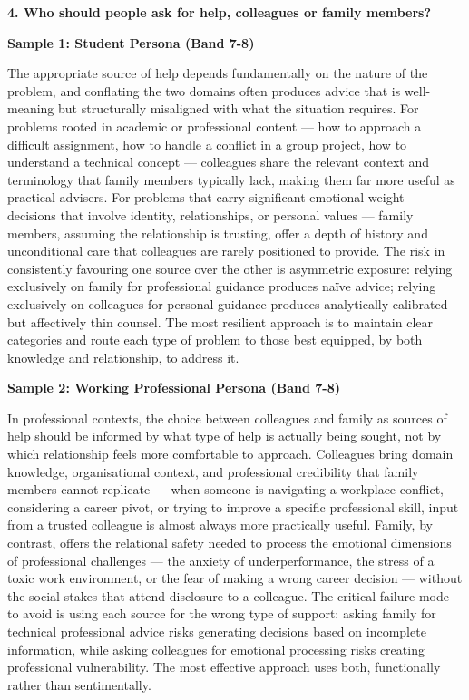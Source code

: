\separator

\begin{ieltsquestion}
\textbf{4. Who should people ask for help, colleagues or family members?}
\end{ieltsquestion}
\textbf{Sample 1: Student Persona (Band 7-8)}

The appropriate source of help depends fundamentally on the nature of the problem, and conflating the two domains often produces advice that is well-meaning but structurally misaligned with what the situation requires. For problems rooted in academic or professional content — how to approach a difficult assignment, how to handle a conflict in a group project, how to understand a technical concept — colleagues share the relevant context and terminology that family members typically lack, making them far more useful as practical advisers. For problems that carry significant emotional weight — decisions that involve identity, relationships, or personal values — family members, assuming the relationship is trusting, offer a depth of history and unconditional care that colleagues are rarely positioned to provide. The risk in consistently favouring one source over the other is asymmetric exposure: relying exclusively on family for professional guidance produces naïve advice; relying exclusively on colleagues for personal guidance produces analytically calibrated but affectively thin counsel. The most resilient approach is to maintain clear categories and route each type of problem to those best equipped, by both knowledge and relationship, to address it.

\textbf{Sample 2: Working Professional Persona (Band 7-8)}

In professional contexts, the choice between colleagues and family as sources of help should be informed by what type of help is actually being sought, not by which relationship feels more comfortable to approach. Colleagues bring domain knowledge, organisational context, and professional credibility that family members cannot replicate — when someone is navigating a workplace conflict, considering a career pivot, or trying to improve a specific professional skill, input from a trusted colleague is almost always more practically useful. Family, by contrast, offers the relational safety needed to process the emotional dimensions of professional challenges — the anxiety of underperformance, the stress of a toxic work environment, or the fear of making a wrong career decision — without the social stakes that attend disclosure to a colleague. The critical failure mode to avoid is using each source for the wrong type of support: asking family for technical professional advice risks generating decisions based on incomplete information, while asking colleagues for emotional processing risks creating professional vulnerability. The most effective approach uses both, functionally rather than sentimentally.

